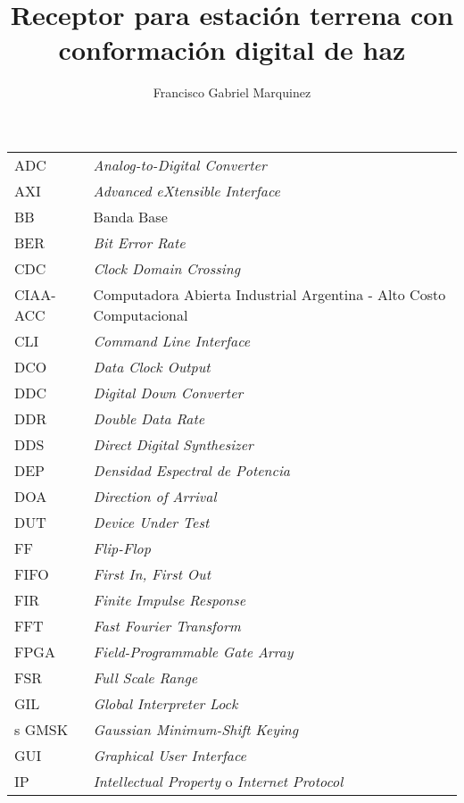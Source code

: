 \documentclass[screen, pagebackref,oneside]{ibtesis}
\title{Receptor para estación terrena con conformación digital de haz}
\author{Francisco Gabriel Marquinez}
\begin{document}
\begin{preliminary}


    \begin{abreviaturas}
        \begin{longtable}{ll}
            ADC &   \textit{Analog-to-Digital Converter} \\
            AXI &   \textit{Advanced eXtensible Interface}  \\
            BB  &   Banda Base  \\
            BER &   \textit{Bit Error Rate} \\
            CDC &   \textit{Clock Domain Crossing}  \\
            CIAA-ACC & Computadora Abierta Industrial Argentina - Alto Costo Computacional  \\
            CLI &   \textit{Command Line Interface} \\  
            DCO &   \textit{Data Clock Output}  \\
            DDC &   \textit{Digital Down Converter} \\
            DDR &   \textit{Double Data Rate}   \\
            DDS &   \textit{Direct Digital Synthesizer} \\
            DEP &   \textit{Densidad Espectral de Potencia} \\   
            DOA &   \textit{Direction of Arrival}   \\
            DUT &   \textit{Device Under Test}  \\
            FF  &   \textit{Flip-Flop}  \\
            FIFO &  \textit{First In, First Out}    \\
            FIR &   \textit{Finite Impulse Response}    \\
            FFT &   \textit{Fast Fourier Transform} \\
            FPGA &  \textit{Field-Programmable Gate Array} \\
            FSR &   \textit{Full Scale Range}   \\
            GIL &   \textit{Global Interpreter Lock}    \\s
            GMSK &  \textit{Gaussian Minimum-Shift Keying} \\
            GUI &   \textit{Graphical User Interface}   \\
            IP &    \textit{Intellectual Property} o \textit{Internet Protocol} \\

\end{longtable}
\end{abreviaturas}
\end{preliminary}
\end{document}
